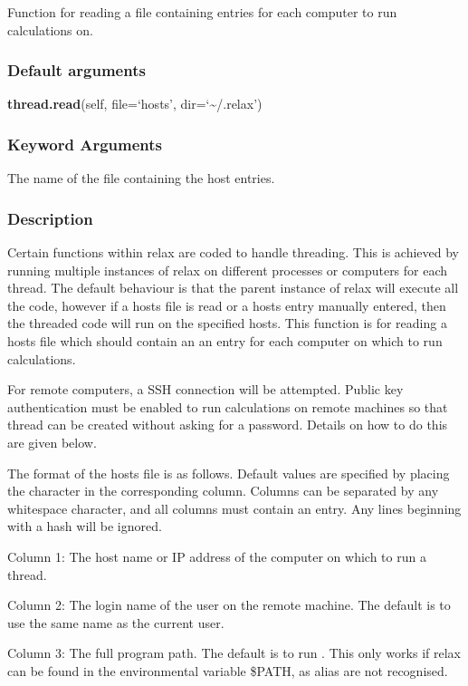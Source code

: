Function for reading a file containing entries for each computer to run calculations on.

\subsubsection{Default arguments}

\textsf{\textbf{thread.read}(self, file=`hosts', dir=`\~{}/.relax')}


\subsubsection{Keyword Arguments}

  The name of the file containing the host entries.


\subsubsection{Description}

Certain functions within relax are coded to handle threading.  This is achieved by running
multiple instances of relax on different processes or computers for each thread.  The
default behaviour is that the parent instance of relax will execute all the code, however if
a hosts file is read or a hosts entry manually entered, then the threaded code will run on
the specified hosts.  This function is for reading a hosts file which should contain an
an entry for each computer on which to run calculations.

For remote computers, a SSH connection will be attempted.  Public key authentication must be
enabled to run calculations on remote machines so that thread can be created without asking
for a password.  Details on how to do this are given below.


The format of the hosts file is as follows.  Default values are specified by placing the
character 
 in the corresponding column.  Columns can be separated by any whitespace
character, and all columns must contain an entry.  Any lines beginning with a hash will be
ignored.

Column 1:  The host name or IP address of the computer on which to run a thread.

Column 2:  The login name of the user on the remote machine.  The default is to use the same
name as the current user.

Column 3:  The full program path.  The default is to run 
.  This only works if relax
can be found in the environmental variable \$PATH, as alias are not recognised.

